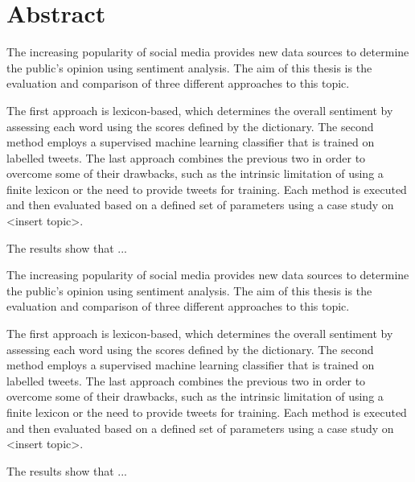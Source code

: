 \chapter*{Abstract}

\iffalse

\selectlanguage{english}
Questions:
\begin{itemize}
\item How much explanation of the methods? --> nicht so viel, so wie ich es gemacht habe
\item Should extraction of tweets be part of the abstract?
\item Should the results be part of the abstract? --> rauslassen, eher Motivation --> contributions Werbung nicht Kurzzusammenfassung,Ziele
\item Motivation/introduction?
Ziele: Was genau soll ermittelt werden, was machen mit diesen Ergebnissen --> results can be used to implement means of evaluating --> Praxisbezug, ein Satz reicht
\end{itemize}
\fi

The increasing popularity of social media provides new data sources to determine the public's opinion using sentiment analysis. The aim of this thesis is the evaluation and comparison of three different approaches to this topic.

The first approach is lexicon-based, which determines the overall sentiment by assessing each word using the scores defined by the dictionary. The second method employs a supervised machine learning classifier that is trained on labelled tweets. The last approach combines the previous two in order to overcome some of their drawbacks, such as the intrinsic limitation of using a finite lexicon or the need to provide tweets for training. Each method is executed and then evaluated based on a defined set of parameters using a case study on <insert topic>.

The results show that ...


The increasing popularity of social media provides new data sources to determine the public's opinion using sentiment analysis. The aim of this thesis is the evaluation and comparison of three different approaches to this topic.

The first approach is lexicon-based, which determines the overall sentiment by assessing each word using the scores defined by the dictionary. The second method employs a supervised machine learning classifier that is trained on labelled tweets. The last approach combines the previous two in order to overcome some of their drawbacks, such as the intrinsic limitation of using a finite lexicon or the need to provide tweets for training. Each method is executed and then evaluated based on a defined set of parameters using a case study on <insert topic>.

The results show that ...





